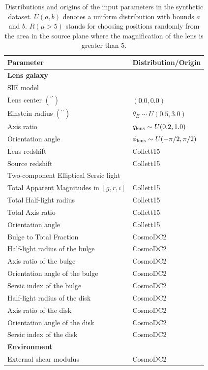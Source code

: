 \documentclass[12pt, twocolumn, apj]{openjournal}
\begin{document}
\begin{table}
\caption{\label{tab:parameter_distributions} Distributions and origins of the input parameters in the synthetic dataset. $U(a, b)$ denotes a uniform distribution with bounds $a$ and $b$. $R(\mu > 5)$ stands for choosing positions randomly from the area in the source plane where the magnification of the lens is greater than $5$.}
\begin{center}
\renewcommand{\arraystretch}{1.0}
\begin{tabular}{ l l}
\hline
{\bf Parameter} & {\bf Distribution/Origin} \\
\hline\hline
{\bf Lens galaxy} \\
\hline \hline
{SIE model} \\
\hline
{Lens center $(^{\prime\prime})$} & $(0.0, 0.0)$ \\
Einstein radius $(^{\prime\prime})$ & $\theta_E \sim U(0.5, 3.0)$ \\ 
Axis ratio & $q_{\rm lens} \sim U(0.2, 1.0)$ \\ 
Orientation angle & $\phi_{\rm lens} \sim U(-\pi/2, \pi/2)$ \\ 
Lens redshift & Collett15 \\
Source redshift & Collett15 \\ 
\hline 
{Two-component Elliptical Sersic light} \\ 
\hline
Total Apparent Magnitudes in $[g,r,i]$ & Collett15 \\
Total Half-light radius & Collett15 \\
Total Axis ratio & Collett15 \\
Orientation angle & Collett15 \\
Bulge to Total Fraction & CosmoDC2\\
\hline
Half-light radius of the bulge & CosmoDC2 \\ 
Axis ratio of the bulge & CosmoDC2 \\
Orientation angle of the bulge & CosmoDC2 \\
Sersic index of the bulge & CosmoDC2\\
\hline
Half-light radius of the disk & CosmoDC2 \\ 
Axis ratio of the disk & CosmoDC2 \\
Orientation angle of the disk & CosmoDC2 \\
Sersic index of the disk & CosmoDC2 \\
\hline \hline
{\bf Environment} \\
\hline \hline
External shear modulus & CosmoDC2 \\

\end{tabular}
\end{center}
\end{table}
\end{document}
